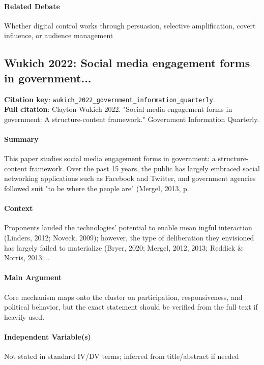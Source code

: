 \documentclass[12pt]{article}
\begin{document}
\paragraph{Related Debate} Whether digital control works through persuasion, selective amplification, covert influence, or audience management


\subsection{Wukich 2022: Social media engagement forms in government...}
\textbf{Citation key}: \texttt{wukich\_2022\_government\_information\_quarterly}.\\
\textbf{Full citation}: Clayton Wukich 2022. "Social media engagement forms in government: A structure-content framework." Government Information Quarterly.

\paragraph{Summary} This paper studies social media engagement forms in government: a structure-content framework. Over the past 15 years, the public has largely embraced social networking applications such as Facebook and Twitter, and government agencies followed suit "to be where the people are" (Mergel, 2013, p.

\paragraph{Context} Proponents lauded the technologies' potential to enable mean ingful interaction (Linders, 2012; Noveck, 2009); however, the type of deliberation they envisioned has largely failed to materialize (Bryer, 2020; Mergel, 2012, 2013; Reddick \& Norris, 2013;...

\paragraph{Main Argument} Core mechanism maps onto the cluster on participation, responsiveness, and political behavior, but the exact statement should be verified from the full text if heavily used.

\paragraph{Independent Variable(s)} Not stated in standard IV/DV terms; inferred from title/abstract if needed
\end{document}
